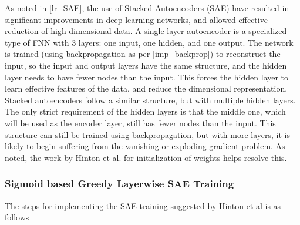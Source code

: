 \documentclass[a4paper,11pt,oneside]{article}
\theoremstyle{plain}
\theoremstyle{definition}
\begin{document}
As noted in \ref{lr_SAE}, the use of Stacked Autoencoders (SAE) have resulted in significant improvements in deep learning networks, and allowed effective reduction of high dimensional data. A single layer autoencoder is a specialized type of FNN with 3 layers: one input, one hidden, and one output. The network is trained (using backpropagation as per \ref{imp_backprop}) to reconstruct the input, so the input and output layers have the same structure, and the hidden layer needs to have fewer nodes than the input. This forces the hidden layer to learn effective features of the data, and reduce the dimensional representation. 
\newline\newline
Stacked autoencoders follow a similar structure, but with multiple hidden layers. The only strict requirement of the hidden layers is that the middle one, which will be used as the encoder layer, still has fewer nodes than the input. This structure can still be trained using backpropagation, but with more layers, it is likely to begin suffering from the vanishing or exploding gradient problem. As noted, the work by Hinton et al. for initialization of weights helps resolve this.

\subsubsection{Sigmoid based Greedy Layerwise SAE Training}\label{imp_sigmoidsae}

The steps for implementing the SAE training suggested by Hinton et al \cite{Hinton2} is as follows
\end{document}
